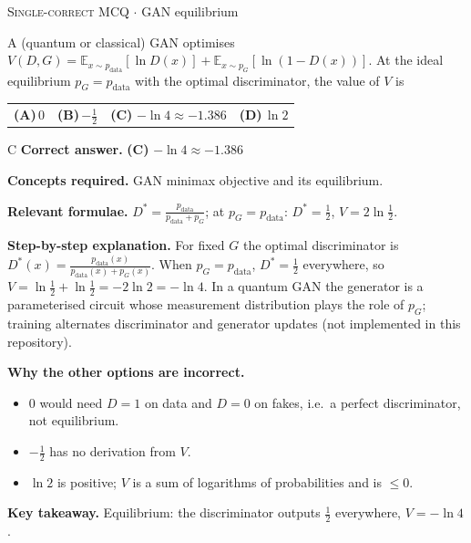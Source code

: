 \documentclass[11pt,a4paper]{article}
\newcommand{\optlabel}[1]{\textbf{(#1)}}
\newcommand{\correctlabel}[1]{\textcolor{okgreen}{\textbf{(#1)}\,\ding{51}}}
\newenvironment{qitem}[1]{\begin{list}{}{\setlength{\leftmargin}{3.3em}\setlength{\labelwidth}{3.1em}%
  \setlength{\labelsep}{0.2em}\setlength{\topsep}{3pt}\setlength{\parsep}{3pt}}\item[\textbf{Q.#1}\hfill]}{\end{list}}
\newcommand{\qsep}{\par\vspace{2pt}{\color{black!15}\hrule}\vspace{4pt}}
\newcommand{\qmeta}[2]{{\footnotesize\color{black!60}\textsc{#1} \;$\cdot$\; #2}\par}
\begin{document}
\begin{qitem}{72}
\qmeta{Single-correct MCQ}{GAN equilibrium}
A (quantum or classical) GAN optimises $V(D, G) = \mathbb E_{x\sim p_{\text{data}}}[\ln D(x)] + \mathbb E_{x\sim p_G}[\ln(1 - D(x))]$.
At the ideal equilibrium $p_G = p_{\text{data}}$ with the optimal discriminator, the value of $V$ is
\par\smallskip\noindent\begin{tabularx}{\linewidth}{@{}*{4}{L}@{}}
\optlabel{A}\,$0$ & \optlabel{B}\,$-\tfrac12$ & \correctlabel{C}\,$-\ln 4 \approx -1.386$ & \optlabel{D}\,$\ln 2$
\end{tabularx}
\end{qitem}
\begin{solbox}{C}
\textbf{\color{brand}Correct answer.} \textcolor{okgreen}{\textbf{(C)}} $-\ln 4 \approx -1.386$

\textbf{\color{brand}Concepts required.} GAN minimax objective and its equilibrium.

\textbf{\color{brand}Relevant formulae.} $D^* = \frac{p_{\text{data}}}{p_{\text{data}} + p_G}$; at $p_G = p_{\text{data}}$: $D^* = \frac12$, $V = 2\ln\frac12$.

\textbf{\color{brand}Step-by-step explanation.} For fixed $G$ the optimal discriminator is $D^*(x) = \frac{p_{\text{data}}(x)}{p_{\text{data}}(x) + p_G(x)}$. When $p_G = p_{\text{data}}$, $D^* = \frac12$
everywhere, so $V = \ln\frac12 + \ln\frac12 = -2\ln2 = -\ln4$. In a quantum GAN the generator is a parameterised circuit whose
measurement distribution plays the role of $p_G$; training alternates discriminator and generator updates (not implemented in this repository).

\textbf{\color{brand}Why the other options are incorrect.}
\begin{itemize}[leftmargin=2.4em, itemsep=1pt, topsep=2pt]
\item[\textbf{(A)}] $0$ would need $D = 1$ on data and $D = 0$ on fakes, i.e.\ a perfect discriminator, not equilibrium.
\item[\textbf{(B)}] $-\frac12$ has no derivation from $V$.
\item[\textbf{(D)}] $\ln2$ is positive; $V$ is a sum of logarithms of probabilities and is $\le 0$.
\end{itemize}
\textbf{\color{brand}Key takeaway.} Equilibrium: the discriminator outputs $\frac12$ everywhere, $V = -\ln4$.
\end{solbox}
\qsep
\end{document}
